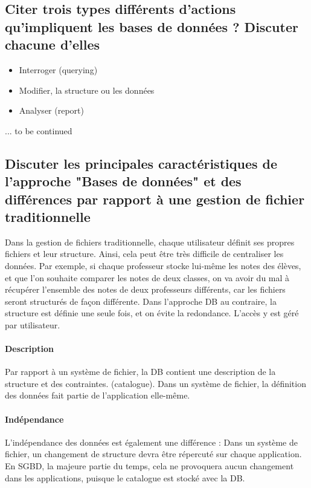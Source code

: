 \subsection{Citer trois types différents d'actions qu'impliquent les bases de données ? Discuter chacune d'elles}
\begin{itemize}
	\item Interroger (querying)
	\item Modifier, la structure ou les données
	\item Analyser (report)
\end{itemize} 
... to be continued


\subsection{Discuter les principales caractéristiques de l'approche "Bases de données" et des différences par rapport à une gestion de fichier traditionnelle}

Dans la gestion de fichiers traditionnelle, chaque utilisateur définit 
ses propres fichiers et leur structure. Ainsi, cela peut être très difficile 
de centraliser les données. Par exemple, si chaque professeur stocke lui-même 
les notes des élèves, et que l'on souhaite comparer les notes de deux classes, 
on va avoir du mal à récupérer l'ensemble des notes de deux professeurs différents, 
car les fichiers seront structurés de façon différente.
Dans l'approche DB au contraire, la structure est définie une seule fois, et on 
évite la redondance. L'accès y est géré par utilisateur.

\paragraph{Description}Par rapport à un système de fichier, la DB contient une description 
de la structure et des contraintes. (catalogue). Dans un système de fichier, la 
définition des données fait partie de l'application elle-même. 

\paragraph{Indépendance}L'indépendance des données est également une différence : Dans un système de fichier, 
un changement de structure devra être répercuté sur chaque application.
En SGBD, la majeure partie du temps, cela ne provoquera aucun changement 
dans les applications, puisque le catalogue est stocké avec la DB.

